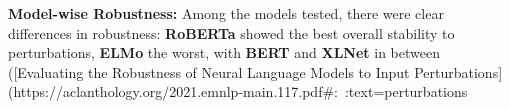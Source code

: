 \textbf{Model-wise Robustness:} Among the models tested, there were clear differences in robustness: \textbf{RoBERTa} showed the best overall stability to perturbations, \textbf{ELMo} the worst, with \textbf{BERT} and \textbf{XLNet} in between ([Evaluating the Robustness of Neural Language Models to Input Perturbations](https://aclanthology.org/2021.emnlp-main.117.pdf#:~:text=perturbations%